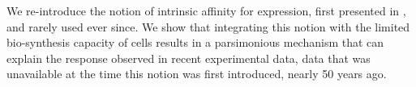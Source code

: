 We re-introduce the notion of intrinsic affinity for expression, first presented in \cite{Maaloe1969}, and rarely used ever since.
We show that integrating this notion with the limited bio-synthesis capacity of cells results in a parsimonious mechanism that can explain the response observed in recent experimental data, data that was unavailable at the time this notion was first introduced, nearly 50 years ago.
